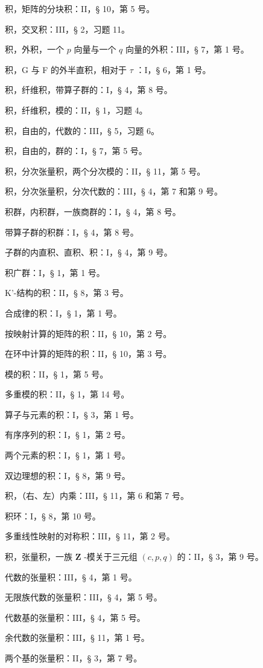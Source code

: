 积，矩阵的分块积：II，§ 10，第 5 号。

积，交叉积：III，§ 2，习题 11。

积，外积，一个 \(p\) 向量与一个 \(q\) 向量的外积：III，§ 7，第 1 号。

积，G 与 F 的外半直积，相对于 \(\tau\) ：I，§ 6，第 1 号。

积，纤维积，带算子群的：I，§ 4，第 8 号。

积，纤维积，模的：II，§ 1，习题 4。

积，自由的，代数的：III，§ 5，习题 6。

积，自由的，群的：I，§ 7，第 5 号。

积，分次张量积，两个分次模的：II，§ 11，第 5 号。

积，分次张量积，分次代数的：III，§ 4，第 7 和第 9 号。

积群，内积群，一族商群的：I，§ 4，第 8 号。

带算子群的积群：I，§ 4，第 8 号。

子群的内直积、直积、积：I，§ 4，第 9 号。

积广群：I，§ 1，第 1 号。

K'-结构的积：II，§ 8，第 3 号。

合成律的积：I，§ 1，第 1 号。

按映射计算的矩阵的积：II，§ 10，第 2 号。

在环中计算的矩阵的积：II，§ 10，第 3 号。

模的积：II，§ 1，第 5 号。

多重模的积：II，§ 1，第 14 号。

算子与元素的积：I，§ 3，第 1 号。

有序序列的积：I，§ 1，第 2 号。

两个元素的积：I，§ 1，第 1 号。

双边理想的积：I，§ 8，第 9 号。

积，（右、左）内乘：III，§ 11，第 6 和第 7 号。

积环：I，§ 8，第 10 号。

多重线性映射的对称积：III，§ 11，第 2 号。

积，张量积，一族 \(\mathbf{Z}\) -模关于三元组 \((c, p, q)\) 的：II，§ 3，第 9 号。

代数的张量积：III，§ 4，第 1 号。

无限族代数的张量积：III，§ 4，第 5 号。

代数基的张量积：III，§ 4，第 5 号。

余代数的张量积：III，§ 11，第 1 号。

两个基的张量积：II，§ 3，第 7 号。

